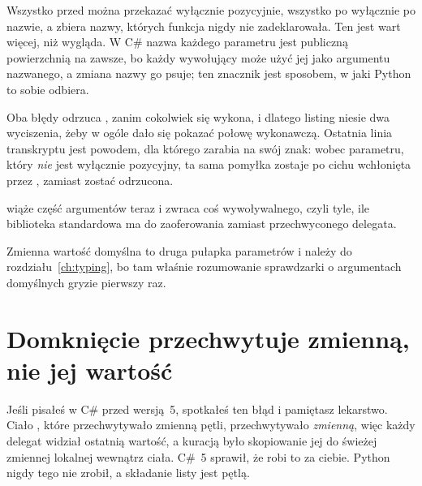 \noindent
Wszystko przed \code{/} można przekazać wyłącznie pozycyjnie, wszystko po
\code{*} wyłącznie po nazwie, a  zbiera nazwy, których
funkcja nigdy nie zadeklarowała. Ten \code{/} jest wart więcej, niż wygląda.
W C\# nazwa każdego parametru jest publiczną powierzchnią na zawsze, bo
każdy wywołujący może użyć jej jako argumentu nazwanego, a zmiana nazwy go
psuje; ten znacznik jest sposobem, w jaki Python to sobie odbiera.



\begin{note}
Oba błędy odrzuca , zanim cokolwiek się wykona, i dlatego
listing niesie dwa wyciszenia, żeby w ogóle dało się pokazać połowę
wykonawczą. Ostatnia linia transkryptu jest powodem, dla którego \code{/}
zarabia na swój znak: wobec parametru, który \emph{nie} jest wyłącznie
pozycyjny, ta sama pomyłka zostaje po cichu wchłonięta przez
, zamiast zostać odrzucona.
\end{note}

 wiąże część argumentów teraz i zwraca coś
wywoływalnego, czyli tyle, ile biblioteka standardowa ma do zaoferowania
zamiast przechwyconego delegata.


\noindent
Zmienna wartość domyślna \dash{}  \dash{} to druga
pułapka parametrów i należy do rozdziału~\ref{ch:typing}, bo tam właśnie
rozumowanie sprawdzarki o argumentach domyślnych gryzie pierwszy raz.

\section{Domknięcie przechwytuje zmienną, nie jej wartość}
\label{sec:ch05-closures}

Jeśli pisałeś w C\# przed wersją~5, spotkałeś ten błąd i pamiętasz lekarstwo.
Ciało , które przechwytywało zmienną pętli, przechwytywało
\emph{zmienną}, więc każdy delegat widział ostatnią wartość, a kuracją było
skopiowanie jej do świeżej zmiennej lokalnej wewnątrz ciała. C\#~5 sprawił,
że  robi to za ciebie. Python nigdy tego nie zrobił, a
składanie listy jest pętlą.

